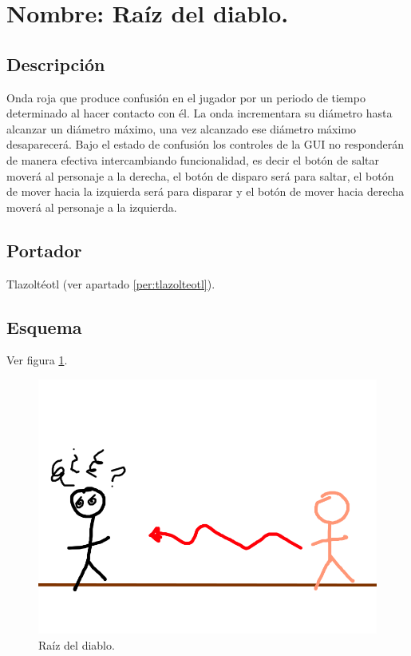 \section{Nombre: Raíz del diablo.}\label{hab.RaizDia}
\subsection{Descripción}
Onda roja que produce confusión en el jugador por un periodo de tiempo determinado al hacer contacto con él. La onda incrementara su diámetro hasta alcanzar un diámetro máximo, una vez alcanzado ese diámetro máximo desaparecerá. Bajo el estado de confusión los controles de la GUI no responderán de manera efectiva intercambiando funcionalidad, es decir el botón de saltar moverá al personaje a la derecha, el botón de disparo será para saltar, el botón de mover hacia la izquierda será para disparar y el botón de mover hacia derecha moverá al personaje a la izquierda. 
\subsection{Portador}
Tlazoltéotl (ver apartado \ref{per:tlazolteotl}).
\subsection{Esquema}
			Ver figura \ref{fig:raiz}.
			\begin{figure}
				\centering
				\includegraphics[height=0.2 \textheight]{Imagenes/raiz}
				\caption{Raíz del diablo.}
				\label{fig:raiz}
			\end{figure}
